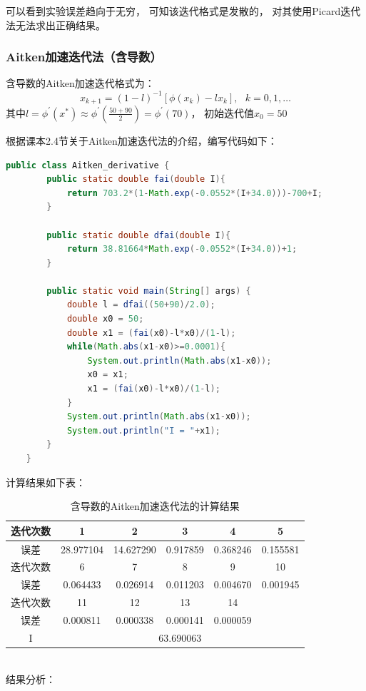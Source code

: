 \documentclass[12pt,a4paper]{article}
\begin{document}
可以看到实验误差趋向于无穷，
可知该迭代格式是发散的，
对其使用Picard迭代法无法求出正确结果。

\subsubsection{Aitken加速迭代法（含导数）}
含导数的Aitken加速迭代格式为：
\begin{equation}
    x_{k+1}=(1-l)^{-1}[\phi(x_k)-lx_k],~~~k=0,1,\dots
\end{equation}
其中$l=\phi^{'}(x^{*})\approx\phi^{'}(\frac{50+90}{2})=\phi^{'}(70)$，
初始迭代值$x_0=50$

根据课本2.4节关于Aitken加速迭代法的介绍，编写代码如下：
\begin{lstlisting}[language={java}]
    public class Aitken_derivative {
        public static double fai(double I){
            return 703.2*(1-Math.exp(-0.0552*(I+34.0)))-700+I;
        }
    
        public static double dfai(double I){
            return 38.81664*Math.exp(-0.0552*(I+34.0))+1;
        }
    
        public static void main(String[] args) {
            double l = dfai((50+90)/2.0);
            double x0 = 50;
            double x1 = (fai(x0)-l*x0)/(1-l);
            while(Math.abs(x1-x0)>=0.0001){
                System.out.println(Math.abs(x1-x0));
                x0 = x1;
                x1 = (fai(x0)-l*x0)/(1-l);
            }
            System.out.println(Math.abs(x1-x0));
            System.out.println("I = "+x1);
        }
    }
\end{lstlisting}

计算结果如下表：
\begin{table}[ht]
    \centering
    \begin{tabular}{|c|c|c|c|c|c|} 
     \hline
     迭代次数 & 1 & 2 & 3 & 4 & 5 \\ [0.5ex] 
     \hline
     误差 & 28.977104 & 14.627290 & 0.917859 & 0.368246 & 0.155581 \\ 
     \hline
     迭代次数 & 6 & 7 & 8 & 9 & 10 \\
     \hline
     误差 & 0.064433 & 0.026914 & 0.011203 & 0.004670 & 0.001945 \\
     \hline
     迭代次数 & 11 & 12 & 13 & 14 &  \\
     \hline
     误差 & 0.000811 & 0.000338 & 0.000141 & 0.000059 & \\
     \hline
     I & \multicolumn{5}{c|}{63.690063} \\
     \hline
    \end{tabular}
    \caption{含导数的Aitken加速迭代法的计算结果}
    \label{table:5}
\end{table}
~\\
结果分析：
\end{document}
